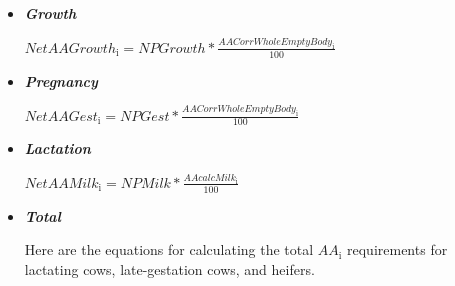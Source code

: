 \begin{refsection}
\begin{itemize}
\begin{enumerate}
        \item \underline {Endogenous Urinary Protein}
        \vspace{0.2cm}

    \begin{center}
    \(NetAAEndUrine_{\text{i}} = 0.010 * 6.2.5 * BW * \frac{AACorrWholeEmptyBody_{\text{i}}}{100}\)
    \end{center}

        \item \underline {Metabolic Fecal Protein}
        \vspace{0.2cm}

    \begin{center}
    \(NetAAMFP_{\text{i}} = NPMFP * \frac{AACorrMFP_{\text{i}}}{100}\)
    \end{center}
    \end{enumerate}
    \vspace{0.25cm}

    \item \textbf{\textit{Growth}} 
    \vspace{0.25cm}

    \begin{center}
    \(NetAAGrowth_{\text{i}} = NPGrowth * \frac{AACorrWholeEmptyBody_{\text{i}}}{100}\)
    \end{center}
    \vspace{0.25cm}

    \item \textbf{\textit{Pregnancy}} 
    \vspace{0.25cm}

    \begin{center}
    \(NetAAGest_{\text{i}} = NPGest * \frac{AACorrWholeEmptyBody_{\text{i}}}{100}\)
    \end{center}
    \vspace{0.25cm}

    \item \textbf{\textit{Lactation}} 
    \vspace{0.25cm}

    \begin{center}
    \(NetAAMilk_{\text{i}} = NPMilk * \frac{AAcalcMilk_{\text{i}}}{100}\)
    \end{center}
    \vspace{0.25cm}


    \item \textbf{\textit{Total}} 
    
    Here are the equations for calculating the total \(AA_{\text{i}}\) requirements for lactating cows, late-gestation cows, and heifers. 
    \vspace{0.2cm}
    

\end{itemize}
\end{refsection}
